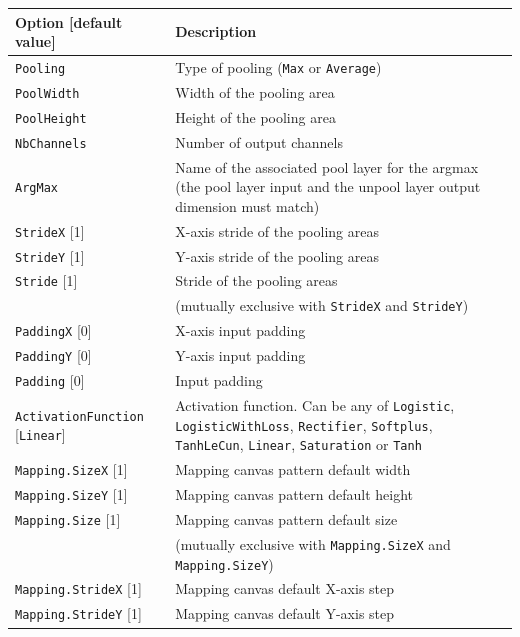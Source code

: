 \documentclass[a4paper,11pt,oneside]{article}
\begin{document}
\begin{center}
 \begin{longtable}{| p{5cm} | p{10cm} | }
 \hline
 Option [default value] & Description\\
 \hline\hline
  \cellcolor{requiredcolor}\lstinline!Pooling! & Type of pooling
  (\lstinline!Max! or \lstinline!Average!)\\
  \cellcolor{requiredcolor}\lstinline!PoolWidth! & Width of the pooling area \\
  \cellcolor{requiredcolor}\lstinline!PoolHeight! & Height of the pooling
area \\
  \cellcolor{requiredcolor}\lstinline!NbChannels! & Number of output channels \\
  \cellcolor{requiredcolor}\lstinline!ArgMax! & Name of the associated pool
  layer for the argmax (the pool layer input and the unpool layer output
  dimension must match) \\
  \lstinline!StrideX! [1] & X-axis stride of the pooling areas \\
  \lstinline!StrideY! [1] & Y-axis stride of the pooling areas \\
  \lstinline!Stride! [1] & Stride of the pooling areas \\
   & (mutually exclusive with \lstinline!StrideX! and \lstinline!StrideY!) \\
  \lstinline!PaddingX! [0] & X-axis input padding \\
  \lstinline!PaddingY! [0] & Y-axis input padding \\
  \lstinline!Padding! [0] & Input padding \\
  \lstinline!ActivationFunction! [\lstinline!Linear!] & Activation function.
  Can be any of \lstinline!Logistic!,  \lstinline!LogisticWithLoss!,
  \lstinline!Rectifier!, \lstinline!Softplus!, \lstinline!TanhLeCun!,
  \lstinline!Linear!, \lstinline!Saturation! or \lstinline!Tanh! \\
  \lstinline!Mapping.SizeX! [1] & Mapping canvas pattern default width \\
  \lstinline!Mapping.SizeY! [1] & Mapping canvas pattern default height \\
  \lstinline!Mapping.Size! [1] & Mapping canvas pattern default size \\
   & (mutually exclusive with \lstinline!Mapping.SizeX!
   and \lstinline!Mapping.SizeY!) \\
  \lstinline!Mapping.StrideX! [1] & Mapping canvas default X-axis step \\
  \lstinline!Mapping.StrideY! [1] & Mapping canvas default Y-axis step \\

\end{longtable}
\end{center}
\end{document}
